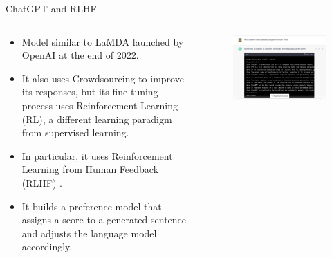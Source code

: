 \documentclass[handout]{beamer}
\begin{document}
\begin{frame}{ChatGPT and RLHF}
\begin{columns}[T]
\begin{column}{0.5\textwidth}
\begin{scriptsize}
\begin{itemize}
\item Model similar to LaMDA launched by OpenAI at the end of 2022.
\item It also uses Crowdsourcing to improve its responses, but its fine-tuning process uses Reinforcement Learning (RL), a different learning paradigm from supervised learning.
\item In particular, it uses Reinforcement Learning from Human Feedback (RLHF) \cite{ouyang2022training}.
\item It builds a preference model that assigns a score to a generated sentence and adjusts the language model accordingly.
\end{itemize}
\end{scriptsize}
\end{column}
\begin{column}{0.5\textwidth}
\begin{figure}[h]
	\includegraphics[scale = 0.25]{pics/chatgpt.png}
\end{figure}
\end{column}
\end{columns}
\end{frame}
\end{document}

